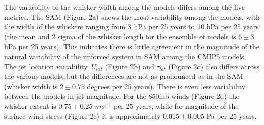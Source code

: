 The variability of the whisker width among the models differs among the five
metrics. The SAM (Figure 2a) shows the most variability among the models, with
the width of the whiskers ranging from 3 hPa per 25 years to 10 hPa per 25 years
(the mean and 2 sigma of the whisker length for the ensemble of models is $6 \pm
3$ hPa per 25 years). This indicates there is little agreement in the magnitude
of the natural variability of the unforced system in SAM among the CMIP5 models.
The jet location variability, $U_{lat}$ (Figure 2b) and $\tau_{lat}$ (Figure 2c)
also differs across the various models,  but the differences are not as
pronounced as in the SAM (whisker width is $2 \pm 0.75$ degrees per 25 years).
There is even less variability between the models in  jet magnitude. For the
850mb winds (Figure 2d) the whisker extent is $0.75 \pm 0.25$ $m s^{-1}$ per 25
years, while for magnitude of the surface wind-stress (Figure 2e) it is
approximately $0.015 \pm 0.005$ Pa per 25 years.

